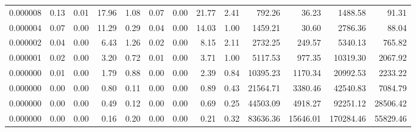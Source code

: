 \begin{tabular}{lrrrrrrrrrrrr}
0.000008 & 0.13 & 0.01 & 17.96 & 1.08 & 0.07 & 0.00 & 21.77 & 2.41 & 792.26 & 36.23 & 1488.58 & 91.31 \\
0.000004 & 0.07 & 0.00 & 11.29 & 0.29 & 0.04 & 0.00 & 14.03 & 1.00 & 1459.21 & 30.60 & 2786.36 & 88.04 \\
0.000002 & 0.04 & 0.00 & 6.43 & 1.26 & 0.02 & 0.00 & 8.15 & 2.11 & 2732.25 & 249.57 & 5340.13 & 765.82 \\
0.000001 & 0.02 & 0.00 & 3.20 & 0.72 & 0.01 & 0.00 & 3.71 & 1.00 & 5117.53 & 977.35 & 10319.30 & 2067.92 \\
0.000000 & 0.01 & 0.00 & 1.79 & 0.88 & 0.00 & 0.00 & 2.39 & 0.84 & 10395.23 & 1170.34 & 20992.53 & 2233.22 \\
0.000000 & 0.00 & 0.00 & 0.80 & 0.11 & 0.00 & 0.00 & 0.89 & 0.43 & 21564.71 & 3380.46 & 42540.83 & 7084.79 \\
0.000000 & 0.00 & 0.00 & 0.49 & 0.12 & 0.00 & 0.00 & 0.69 & 0.25 & 44503.09 & 4918.27 & 92251.12 & 28506.42 \\
0.000000 & 0.00 & 0.00 & 0.16 & 0.20 & 0.00 & 0.00 & 0.21 & 0.32 & 83636.36 & 15646.01 & 170284.46 & 55829.46 \\
\bottomrule
\end{tabular}
